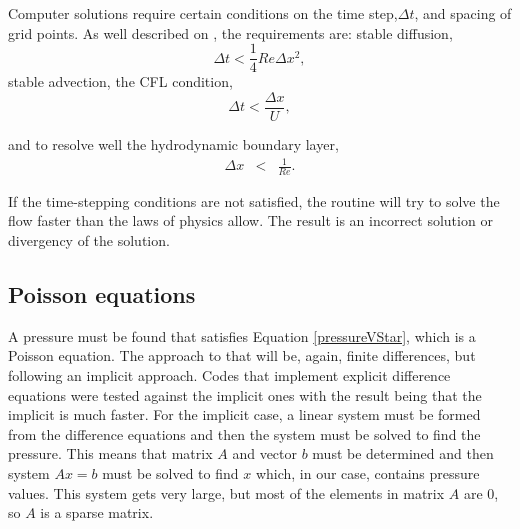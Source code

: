 \documentclass[journal]{IEEEtran}
\begin{document}
Computer solutions require certain conditions on the time step,$\Delta t$, and spacing of grid points. As well described on \cite{hinchLectureNotes}, the requirements are: stable diffusion, 
\begin{equation}
\Delta t < \frac{1}{4}\mathit{Re}\Delta x^2, \label{stablediffusion}
\end{equation} stable advection, the CFL condition,
\begin{equation}
\Delta t < \frac{\Delta x}{U}, \label{stableadvection}
\end{equation}

 and to resolve well the hydrodynamic boundary layer,  
 \begin{eqnarray}
\Delta x &<& \frac{1}{\mathit{Re}}. \label{boundarylayer}
\end{eqnarray} 

If the time-stepping conditions are not satisfied, the routine will try to solve the flow faster than the laws of physics allow. The result is an incorrect solution or divergency of the solution.


\subsection{Poisson equations}

A pressure must be found that satisfies Equation \ref{pressureVStar}, which is a Poisson equation. The approach to that will be, again, finite differences, but following an implicit approach. Codes that implement explicit difference equations were tested against the implicit ones with the result being that the implicit is much faster. For the implicit case, a linear system must be formed from the difference equations and then the system must be solved to find the pressure. This means that matrix $A$ and vector $b$ must be determined and then system $Ax = b$ must be solved to find $x$ which, in our case, contains pressure values. This system gets very large, but most of the elements in matrix $A$ are 0, so $A$ is a sparse matrix. 
\end{document}
